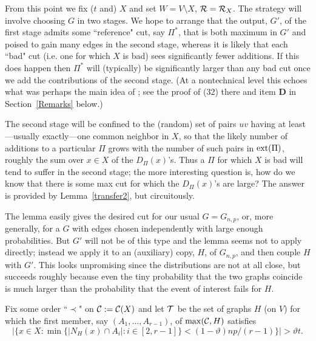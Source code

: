 \documentclass[letterpaper,11pt]{article}
\newcommand{\beq}[1]{\begin{equation}\label{#1}}
\newcommand{\enq}[0]{\end{equation}}
\newcommand{\sm}[0]{\setminus}
\renewcommand{\dots}[0]{,\ldots,}
\newcommand{\cee}[0]{{\cal C}}
\newcommand{\R}[0]{{\cal R}}
\newcommand{\T}[0]{{\cal T}}
\newcommand{\ext}[0]{{\rm ext}}
\newcommand{\0}[0]{\emptyset}
\newcommand{\vt}[0]{\vartheta}
\begin{document}
\medskip
From this point we fix ($t$
and) $X$
and set $W=V\sm X$, $\R=\R_X$.
%
The strategy will involve choosing $G$ in two stages.
We hope to arrange that the output, $G'$, of the first stage
admits some ``reference" cut, say $\Pi^*$, that is both maximum in $G'$ and
poised to gain many edges in the second stage,
whereas it is likely that each ``bad" cut (i.e. one for which $X$ is bad)
sees significantly fewer additions.
If this does happen then $\Pi^*$
will (typically) be significantly
larger than any bad cut once we add the contributions of the second stage.
%
(At a nontechnical level this echoes
what was perhaps the main idea
of \cite{DKMantel}; see the proof of (32) there
and item {\bf D} in Section~\ref{Remarks} below.)



The second stage will be confined to
the (random) set of pairs $uv$ having at least---usually exactly---one
common neighbor in $X$, so that
the likely number of additions to a particular $\Pi$ grows
with the number of such pairs in $\ext(\Pi)$,
roughly
the sum over $x\in X$ of the $D_\Pi(x)$'s.
Thus a $\Pi$ for which $X$ is bad will tend to suffer in the second stage;
the more interesting question
is, how do we know that there is some max cut
for which the $D_\Pi(x)$'s are large?
%
The answer is provided by
Lemma~\ref{transfer2}, but circuitously.
%

The lemma easily gives the desired cut for our usual
$G=G_{n,p}$, or, more generally, for a $G$ with edges chosen
independently with large enough probabilities.
But $G'$ will not be of this type and the lemma
seems not to apply directly;
%
instead we apply it to an (auxiliary) copy, $H$, of $G_{n,p}$,
and then
couple $H$ with $G'$.
This looks unpromising
since the distributions are not at all close,
but succeeds roughly because
even the tiny probability that the two graphs coincide
is much larger than the probability that the event of interest fails for $H$.




\medskip
Fix some order ``$\prec$" on $\cee:=\cee(X)$
and let $\T$ be the set of graphs $H$ (on $V$) for
which the first member, say
$(A_1\dots A_{r-1})$, of $\max(\cee,H)$
satisfies
\beq{xinX}
|\{x\in X: \min\{|N_H(x)\cap A_i|:i\in [2,r-1]\}
< (1-\vt)np/(r-1)\}| > \vt t.
\enq
\end{document}
